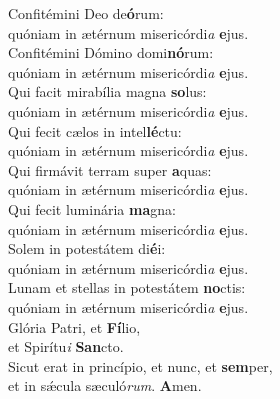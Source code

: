 \evenverse Confitémini Deo de\textbf{ó}rum:~\*\\
\evenverse quóniam in ætérnum misericórdi\textit{a} \textbf{e}jus.\\
\oddverse Confitémini Dómino domi\textbf{nó}rum:~\*\\
\oddverse quóniam in ætérnum misericórdi\textit{a} \textbf{e}jus.\\
\evenverse Qui facit mirabília magna \textbf{so}lus:~\*\\
\evenverse quóniam in ætérnum misericórdi\textit{a} \textbf{e}jus.\\
\oddverse Qui fecit cælos in intel\textbf{lé}ctu:~\*\\
\oddverse quóniam in ætérnum misericórdi\textit{a} \textbf{e}jus.\\
\evenverse Qui firmávit terram super \textbf{a}quas:~\*\\
\evenverse quóniam in ætérnum misericórdi\textit{a} \textbf{e}jus.\\
\oddverse Qui fecit luminária \textbf{ma}gna:~\*\\
\oddverse quóniam in ætérnum misericórdi\textit{a} \textbf{e}jus.\\
\evenverse Solem in potestátem di\textbf{é}i:~\*\\
\evenverse quóniam in ætérnum misericórdi\textit{a} \textbf{e}jus.\\
\oddverse Lunam et stellas in potestátem \textbf{no}ctis:~\*\\
\oddverse quóniam in ætérnum misericórdi\textit{a} \textbf{e}jus.\\
\evenverse Glória Patri, et \textbf{Fí}lio,~\*\\
\evenverse et Spirítu\textit{i} \textbf{San}cto.\\
\oddverse Sicut erat in princípio, et nunc, et \textbf{sem}per,~\*\\
\oddverse et in sǽcula sæculó\textit{rum}. \textbf{A}men.\\
